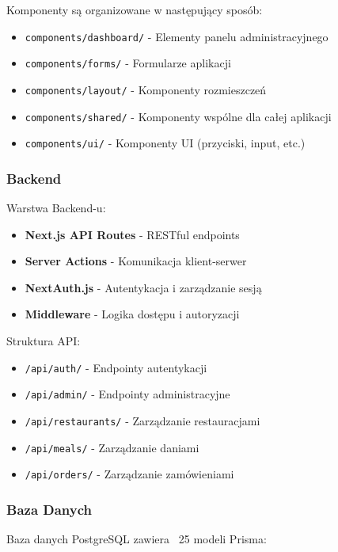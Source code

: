 \documentclass[12pt,a4paper,utf-8]{article}
\begin{document}
Komponenty są organizowane w następujący sposób:
\begin{itemize}
    \item \texttt{components/dashboard/}  -  Elementy panelu administracyjnego
    \item \texttt{components/forms/}  -  Formularze aplikacji
    \item \texttt{components/layout/}  -  Komponenty rozmieszczeń
    \item \texttt{components/shared/}  -  Komponenty wspólne dla całej aplikacji
    \item \texttt{components/ui/}  -  Komponenty UI (przyciski, input, etc.)
\end{itemize}

\subsubsection{Backend}

Warstwa Backend-u:
\begin{itemize}
    \item \textbf{Next.js API Routes}  -  RESTful endpoints
    \item \textbf{Server Actions}  -  Komunikacja klient-serwer
    \item \textbf{NextAuth.js}  -  Autentykacja i zarządzanie sesją
    \item \textbf{Middleware}  -  Logika dostępu i autoryzacji
\end{itemize}

Struktura API:
\begin{itemize}
    \item \texttt{/api/auth/}  -  Endpointy autentykacji
    \item \texttt{/api/admin/}  -  Endpointy administracyjne
    \item \texttt{/api/restaurants/}  -  Zarządzanie restauracjami
    \item \texttt{/api/meals/}  -  Zarządzanie daniami
    \item \texttt{/api/orders/}  -  Zarządzanie zamówieniami
\end{itemize}

\subsubsection{Baza Danych}

Baza danych PostgreSQL zawiera ~25 modeli Prisma:
\end{document}
